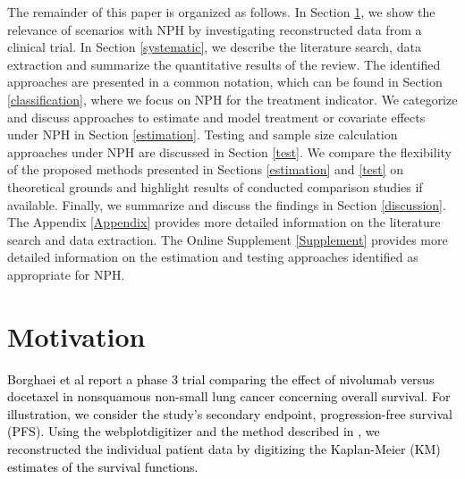 \documentclass{article}
\newcommand{\NEW}[2][black]{\textcolor{#1}{#2}}
\begin{document}
\noindent The remainder of this paper is organized as follows.
In Section \ref{motiv}, we show the relevance of scenarios with NPH by investigating reconstructed data from \NEW{a} clinical trial.
In Section \ref{systematic}, we describe the literature search, data extraction and summarize the quantitative results of the review.
The identified approaches are presented in a common notation, which can be found in Section \ref{classification}, where we focus on NPH for the treatment indicator. 
We categorize and discuss approaches to estimate and model treatment or covariate effects under NPH in Section \ref{estimation}.
Testing and sample size calculation approaches under NPH are discussed in Section \ref{test}. 
We compare the flexibility of the proposed methods presented in Sections \ref{estimation} and \ref{test} on theoretical grounds and highlight results of conducted comparison studies if available.
Finally, we summarize and discuss the findings in Section \ref{discussion}.
The Appendix \ref{Appendix} provides more detailed information on the literature search and data extraction.
The Online Supplement \ref{Supplement} provides more detailed information on the estimation and testing approaches identified as appropriate for NPH.


\section{{Motivation}} \label{motiv} %
\noindent \NEW{Borghaei et al \cite{Borghaei.2015} report a phase 3 trial comparing the effect of nivolumab versus docetaxel in nonsquamous non-small lung cancer concerning overall survival. 
For illustration, we consider the study's secondary endpoint, progression-free survival (PFS).
Using the webplotdigitizer \cite{Rohatgi.2022} and the method described in \cite{Guyot.2012}, we reconstructed the individual patient data by digitizing the Kaplan-Meier (KM) estimates of the survival functions. }
\end{document}
